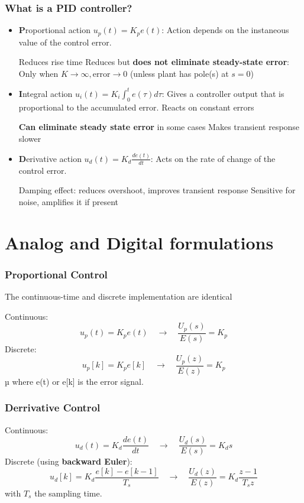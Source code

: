 \begin{frame}
	\frametitle{What is a PID controller?}
	\small{
	\begin{itemize}
		\item \textbf{P}roportional action $u_p(t) = K_p e(t)$: Action depends on the instaneous value of the control error. 
			\begin{itemize}
				\pro Reduces rise time
				\con Reduces but \textbf{does not eliminate steady-state error}: Only when $K \rightarrow \infty , \text{error} \rightarrow 0$
				 (unless plant has pole(s) at $s=0$)
			\end{itemize}
		\item \textbf{I}ntegral action $u_i(t) =K_i\int_0^t e(\tau)d\tau$: Gives a controller output that is proportional to the accumulated error. Reacts on constant errors
			\begin{itemize}
				\pro  \textbf{Can eliminate steady state error} in some cases
				\con Makes transient response slower 
			\end{itemize}
	
		\item \textbf{D}erivative action $u_d(t) = K_d \frac{de(t)}{dt}$: Acts on the rate of change of the control error. 
			\begin{itemize}
				\pro Damping effect: reduces overshoot, improves transient response
				\con Sensitive for noise, amplifies it if present
			\end{itemize}
	\end{itemize}}
\end{frame}
\section{Analog and Digital formulations}

\begin{frame}
	\frametitle{Proportional Control}
	The continuous-time and discrete implementation are identical
	
	Continuous:
	\begin{equation*}
		u_p(t) = K_p e(t) \quad \rightarrow \quad \frac{U_p(s)}{E(s)} = K_p 
	\end{equation*}
	Discrete:
	\begin{equation*}
		u_p[k] = K_p e[k] \quad \rightarrow \quad \frac{U_p(z)}{E(z)} = K_p 
	\end{equation*}µ
	where e(t) or e[k] is the error signal.
\end{frame}

\begin{frame}
	\frametitle{Derrivative Control}
	Continuous:
	\begin{equation*}
		u_d(t) = K_d \frac{de(t)}{dt} \quad \rightarrow \quad \frac{U_d(s)}{E(s)} = K_d s 
	\end{equation*}
	Discrete (using \textbf{backward Euler}):
	\begin{equation*}
	u_d[k] = K_d \frac{ e[k] - e[k-1]}{T_s} \quad \rightarrow \quad \frac{U_d(z)}{E(z)} = K_d \frac{z - 1}{T_sz}
	\end{equation*}
	with $T_s$ the sampling time.

\end{frame}

